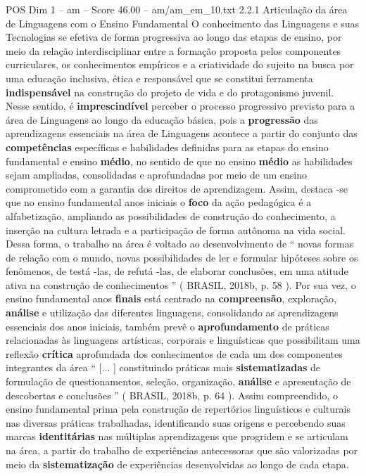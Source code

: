 \begin{textsample}{POS Dim 1 – am – Score 46.00 – am/am\_em\_10.txt}  \label{ex:f1_pos_229}
2.2.1 Articulação da área de Linguagens com o Ensino Fundamental O conhecimento das Linguagens e suas Tecnologias se efetiva de forma progressiva ao longo das etapas de ensino, por meio da relação interdisciplinar entre a formação proposta pelos componentes curriculares, os conhecimentos empíricos e a criatividade do sujeito na busca por uma educação inclusiva, ética e responsável que se constitui ferramenta \textbf{indispensável} na construção do projeto de vida e do protagonismo juvenil.
Nesse sentido, é \textbf{imprescindível} perceber o processo progressivo previsto para a área de Linguagens ao longo da educação básica, pois a \textbf{progressão} das aprendizagens essenciais na área de Linguagens acontece a partir do conjunto das \textbf{competências} específicas e habilidades definidas para as etapas do ensino fundamental e ensino \textbf{médio}, no sentido de que no ensino \textbf{médio} as habilidades sejam ampliadas, consolidadas e aprofundadas por meio de um ensino comprometido com a garantia dos direitos de aprendizagem.
Assim, destaca -se que no ensino fundamental anos iniciais o \textbf{foco} da ação pedagógica é a alfabetização, ampliando as possibilidades de construção do conhecimento, a inserção na cultura letrada e a participação de forma autônoma na vida social.
Dessa forma, o trabalho na área é voltado ao desenvolvimento de “ novas formas de relação com o mundo, novas possibilidades de ler e formular hipóteses sobre os fenômenos, de testá -las, de refutá -las, de elaborar conclusões, em uma atitude ativa na construção de conhecimentos ” ( BRASIL, 2018b, p. 58 ).
Por sua vez, o ensino fundamental anos \textbf{finais} está centrado na \textbf{compreensão}, exploração, \textbf{análise} e utilização das diferentes linguagens, consolidando as aprendizagens essenciais dos anos iniciais, também prevê o \textbf{aprofundamento} de práticas relacionadas às linguagens artísticas, corporais e linguísticas que possibilitam uma reflexão \textbf{crítica} aprofundada dos conhecimentos de cada um dos componentes integrantes da área “ [... ] constituindo práticas mais \textbf{sistematizadas} de formulação de questionamentos, seleção, organização, \textbf{análise} e apresentação de descobertas e conclusões ” ( BRASIL, 2018b, p. 64 ).
Assim compreendido, o ensino fundamental prima pela construção de repertórios linguísticos e culturais nas diversas práticas trabalhadas, identificando suas origens e percebendo suas marcas \textbf{identitárias} nas múltiplas aprendizagens que progridem e se articulam na área, a partir do trabalho de experiências antecessoras que são valorizadas por meio da \textbf{sistematização} de experiências desenvolvidas ao longo de cada etapa.

\end{textsample}
